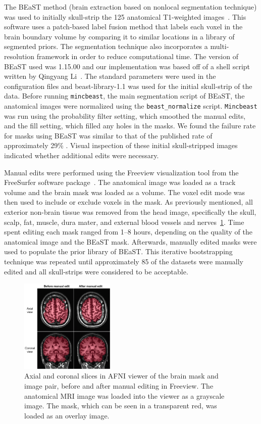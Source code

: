 \par The BEaST method (brain extraction based on nonlocal segmentation technique) was used to initially skull-strip the 125 anatomical T1-weighted images~\cite{Eskildsen2012}. This software uses a patch-based label fusion method that labels each voxel in the brain boundary volume by comparing it to similar locations in a library of segmented priors. The segmentation technique also incorporates a multi-resolution framework in order to reduce computational time. The version of BEaST used was 1.15.00 and our implementation was based off of a shell script written by Qingyang Li~\cite{rpubs}. The standard parameters were used in the configuration files and beast-library-1.1 was used for the initial skull-strip of the data. Before running {\tt mincbeast}, the main segmentation script of BEaST, the anatomical images were normalized using the {\tt beast\_normalize} script. {\tt Mincbeast} was run using the probability filter setting, which smoothed the manual edits, and the fill setting, which filled any holes in the masks. We found the failure rate for masks using BEaST was similar to that of the published rate of approximately 29\% \cite{Eskildsen2012}. Visual inspection of these initial skull-stripped images indicated whether additional edits were necessary.

\par Manual edits were performed using the Freeview visualization tool from the FreeSurfer software package~\cite{Fischl2012}. The anatomical image was loaded as a track volume and the brain mask was loaded as a volume. The voxel edit mode was then used to include or exclude voxels in the mask. As previously mentioned, all exterior non-brain tissue was removed from the head image, specifically the skull, scalp, fat, muscle, dura mater, and external blood vessels and nerves~\ref{fig:edit}. Time spent editing each mask ranged from 1--8 hours, depending on the quality of the anatomical image and the BEaST mask. Afterwards, manually edited masks were used to populate the prior library of BEaST. This iterative bootstrapping technique was repeated until approximately 85 of the datasets were manually edited and all skull-strips were considered to be acceptable.

\begin{figure}[h!]
    \includegraphics[width=0.4\textwidth]{edit.png}
    \caption{
Axial and coronal slices in AFNI viewer of the brain mask and image pair, before and after manual editing in Freeview. The anatomical MRI image was loaded into the viewer as a grayscale image. The mask, which can be seen in a transparent red, was loaded as an overlay image.}
\label{fig:edit}
\end{figure}

